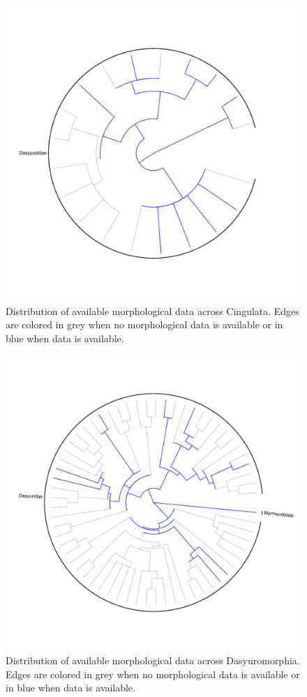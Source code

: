 \documentclass[12pt,letterpaper]{article}
\begin{document}
\begin{figure}[!htbp]
\centering
    \includegraphics[width=1\textwidth]{Supp_figure_CINGULATA.pdf}
\caption{Distribution of available morphological data across Cingulata. Edges are colored in grey when no morphological data is available or in blue when data is available.}
\label{Supp_Figure_Phylo-Cingulata}
\end{figure}

\begin{figure}[!htbp]
\centering
    \includegraphics[width=1\textwidth]{Supp_figure_DASYUROMORPHIA.pdf}
\caption{Distribution of available morphological data across Dasyuromorphia. Edges are colored in grey when no morphological data is available or in blue when data is available.}
\label{Supp_Figure_Phylo-Dasyuromorphia}
\end{figure}
\end{document}
